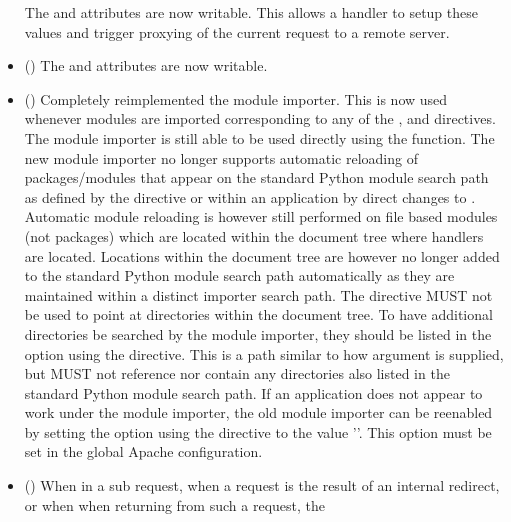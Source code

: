 \begin{itemize}
      The  and  attributes are now writable.
      This allows a handler to setup these values and trigger proxying of the
      current request to a remote server.
    \item
      ()
      The  and  attributes are
      now writable.
    \item
      ()
      Completely reimplemented the module importer. This is now used
      whenever modules are imported corresponding to any of the
      ,  and 
      directives. The module importer is still able to be used directly
      using the  function. The new module
      importer no longer supports automatic reloading of packages/modules
      that appear on the standard Python module search path as defined by
      the  directive or within an application by direct
      changes to . Automatic module reloading is however
      still performed on file based modules (not packages) which are
      located within the document tree where handlers are located.
      Locations within the document tree are however no longer added to the
      standard Python module search path automatically as they are
      maintained within a distinct importer search path. The
       directive MUST not be used to point at directories
      within the document tree. To have additional directories be searched
      by the module importer, they should be listed in the
       option using the 
      directive. This is a path similar to how  argument
      is supplied, but MUST not reference  nor contain any
      directories also listed in the standard Python module search path.
      If an application does not appear to work under the module importer,
      the old module importer can be reenabled by setting the
       option using the 
      directive to the value '\code{*}'. This option must be set in the
      global Apache configuration.
    \item
      ()
      When in a sub request, when a request is the result of an internal
      redirect, or when when returning from such a request, the

\end{itemize}

